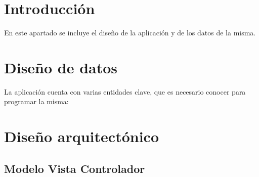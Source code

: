\section{Introducción}\label{introducciondiseno}
En este apartado se incluye el diseño de la aplicación y de los datos de la misma. 

\section{Diseño de datos}\label{datos}
La aplicación cuenta con varias entidades clave, que es necesario conocer para programar la misma:





\begin{landscape}

  \end{landscape}

\section{Diseño arquitectónico}\label{darquitectura}



\subsection{Modelo Vista Controlador}\label{modelovista}


